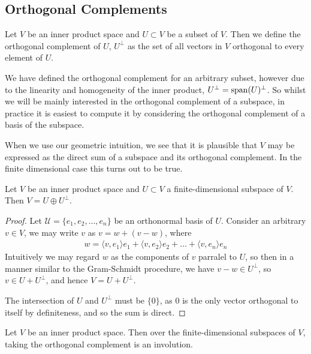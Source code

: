 \documentclass[]{article}
\begin{document}
\subsection{Orthogonal Complements}

\begin{defi} 
		Let $V$ be an inner product space and $U \subset V$ be a subset of $V$. Then we define the orthogonal complement of $U$, $U^{\perp}$ as the set of all vectors in $V$ orthogonal to every element of $U$.
\end{defi}

We have defined the orthogonal complement for an arbitrary subset, however due to the linearity and homogeneity of the inner product, $U^{\perp} = \operatorname{span}(U)^{\perp}$. So whilst we will be mainly interested in the orthogonal complement of a subspace, in practice it is easiest to compute it by considering the orthogonal complement of a basis of the subspace. 

When we use our geometric intuition, we see that it is plausible that $V$ may be expressed as the direct sum of a subspace and its orthogonal complement. In the finite dimensional case this turns out to be true.

\begin{thm}
		Let $V$ be an inner product space and $U \subset V$ a finite-dimensional subspace of $V$. Then $V = U \oplus U^{\perp}$.	
\end{thm}

\begin{proof}
		Let $\mathcal{U} = \{e_1,e_2,\ldots,e_n\}$ be an orthonormal basis of $U$. Consider an arbitrary $v \in V$, we may write $v$ as $v = w + (v - w)$, where
		\begin{align*}
				w = \langle v, e_1 \rangle e_1 + \langle v, e_2 \rangle e_2 + \ldots + \langle v, e_n \rangle e_n
		\end{align*}
		Intuitively we may regard $w$ as the components of $v$ parralel to $U$, so then in a manner similar to the Gram-Schmidt procedure, we have $v-w \in U^{\perp}$, so $v \in U + U^{\perp}$, and hence $V = U + U^{\perp}$. 

		The intersection of $U$ and $U^{\perp}$ must be $\{0\}$, as $0$ is the only vector orthogonal to itself by definiteness, and so the sum is direct.
\end{proof}

\begin{thm}
		Let $V$ be an inner product space. Then over the finite-dimensional subspaces of $V$, taking the orthogonal complement is an involution.	
\end{thm}
\end{document}
